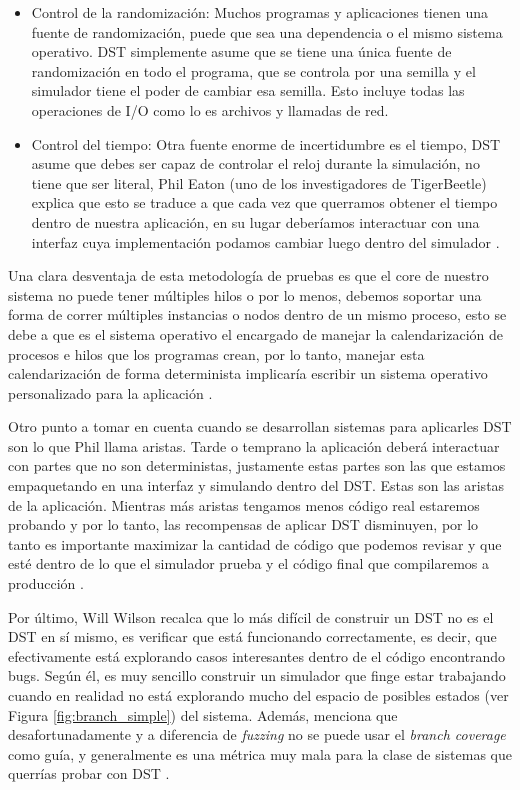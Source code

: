	\begin{itemize}

		\item Control de la randomización: Muchos programas y aplicaciones tienen una fuente de randomización, puede que sea una dependencia o el mismo sistema operativo. DST simplemente asume que se tiene una única fuente de randomización en todo el programa, que se controla por una semilla y el simulador tiene el poder de cambiar esa semilla. Esto incluye todas las operaciones de I/O como lo es archivos y llamadas de red.
		\item Control del tiempo: Otra fuente enorme de incertidumbre es el tiempo, DST asume que debes ser capaz de controlar el reloj durante la simulación, no tiene que ser literal, Phil Eaton (uno de los investigadores de TigerBeetle) explica que esto se traduce a que cada vez que querramos obtener el tiempo dentro de nuestra aplicación, en su lugar deberíamos interactuar con una interfaz cuya implementación podamos cambiar luego dentro del simulador \cite{eaton-2024}.
	\end{itemize}

	Una clara desventaja de esta metodología de pruebas es que el core de nuestro sistema no puede tener múltiples hilos o por lo menos, debemos soportar una forma de correr múltiples instancias o nodos dentro de un mismo proceso, esto se debe a que es el sistema operativo el encargado de manejar la calendarización de procesos e hilos que los programas crean, por lo tanto, manejar esta calendarización de forma determinista implicaría escribir un sistema operativo personalizado para la aplicación \cite{eaton-2024}.

	Otro punto a tomar en cuenta cuando se desarrollan sistemas para aplicarles DST son lo que Phil llama aristas. Tarde o temprano la aplicación deberá interactuar con partes que no son deterministas, justamente estas partes son las que estamos empaquetando en una interfaz y simulando dentro del DST. Estas son las aristas de la aplicación. Mientras más aristas tengamos menos código real estaremos probando y por lo tanto, las recompensas de aplicar DST disminuyen, por lo tanto es importante maximizar la cantidad de código que podemos revisar y que esté dentro de lo que el simulador prueba y el código final que compilaremos a producción \cite{eaton-2024}.

	Por último, Will Wilson recalca que lo más difícil de construir un DST no es el DST en sí mismo, es verificar que está funcionando correctamente, es decir, que efectivamente está explorando casos interesantes dentro de el código encontrando bugs. Según él, es muy sencillo construir un simulador que finge estar trabajando cuando en realidad no está explorando mucho del espacio de posibles estados (ver Figura \ref{fig:branch_simple}) del sistema. Además, menciona que desafortunadamente y a diferencia de \textit{fuzzing} no se puede usar el \textit{branch coverage} como guía, y generalmente es una métrica muy mala para la clase de sistemas que querrías probar con DST \cite{eaton-2024}.
